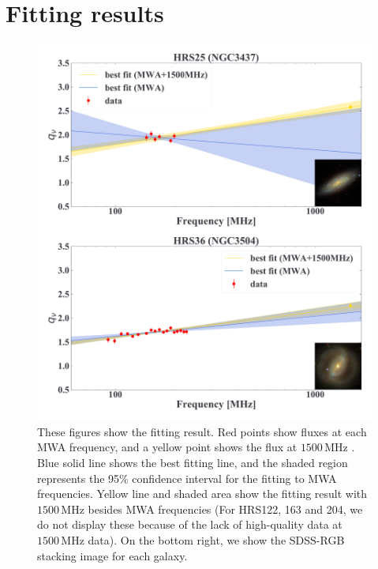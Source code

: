\documentclass[12pt,a4paper,twoside,openright,final,titlepage]{report}
\newcommand{\MHz}{\,\mathrm{MHz}}
\begin{document}
\chapter{Fitting results}\label{chap:fittingresults}
\begin{figure}[htbp]
    \centering
    \includegraphics[width=.85\linewidth]{Figures/AppendixC_qfitting1.pdf}
    \caption[Fitting results for 18 samples (1)]{\label{fig:fittingresults1}
        These figures show the fitting result.
        Red points show fluxes at each MWA frequency, and a yellow point shows the flux at $1500\MHz$ \citep{Boselli2015}.
        Blue solid line shows the best fitting line, and the shaded region represents the 95\% confidence interval for the fitting to MWA frequencies.
        Yellow line and shaded area show the fitting result with $1500\MHz$ besides MWA frequencies (For HRS122, 163 and 204, we do not display these because of the lack of high-quality data at $1500\MHz$ data).
        On the bottom right, we show the SDSS-RGB stacking image for each galaxy.
    }
\end{figure}
\end{document}
